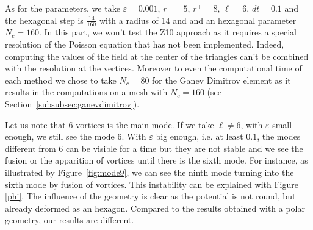 \documentclass[proc]{edpsmath}
\begin{document}
\noindent As for the parameters, we take $\varepsilon=0.001$, $r^-=5$, $r^+=8$, $\ell=6$, $dt=0.1$ and the hexagonal step is $\frac{14}{160}$ with a radius of 14 and and an hexagonal parameter $N_c =160$.
In this part, we won't test the Z10 approach as it requires a special resolution of the Poisson equation that has not been implemented. Indeed, computing the values of the field at the center of the triangles can't be combined with the resolution at the vertices. 
Moreover to even the computational time of each method we chose to take $N_c=80$ for the Ganev Dimitrov element as it results in the computations on a mesh with $N_c =160$ (see Section~\ref{subsubsec:ganevdimitrov}).

Let us note that 6 vortices is the main mode. If we take $\ell\neq6$, with $\varepsilon$ small enough, we still see the mode 6. With $\varepsilon$ big enough, i.e. at least $0.1$, the modes different from 6 can be visible for a time but they are not stable and we see the fusion or the apparition of vortices until there is the sixth mode. For instance, as illustrated by Figure~\ref{fig:mode9}, we can see the ninth mode turning into the sixth mode by fusion of vortices. This instability can be explained with Figure \ref{phi}. The influence of the geometry is clear as the potential is not round, but already deformed as an hexagon. Compared to the results obtained with a polar geometry, our results are different. 
\end{document}
